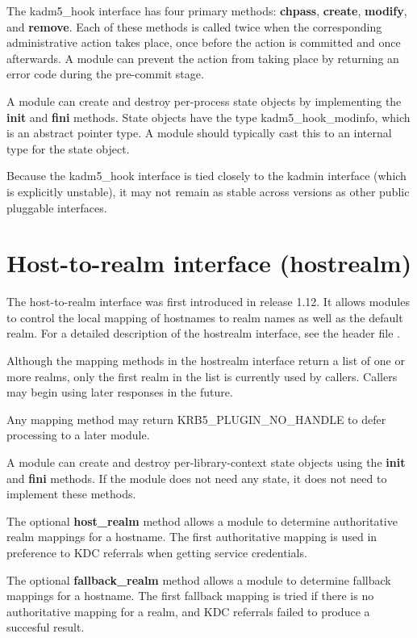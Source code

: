 \documentclass[letterpaper,10pt,english]{sphinxmanual}
\begin{document}
The kadm5\_hook interface has four primary methods: \textbf{chpass},
\textbf{create}, \textbf{modify}, and \textbf{remove}.  Each of these methods is
called twice when the corresponding administrative action takes place,
once before the action is committed and once afterwards.  A module can
prevent the action from taking place by returning an error code during
the pre-commit stage.

A module can create and destroy per-process state objects by
implementing the \textbf{init} and \textbf{fini} methods.  State objects have
the type kadm5\_hook\_modinfo, which is an abstract pointer type.  A
module should typically cast this to an internal type for the state
object.

Because the kadm5\_hook interface is tied closely to the kadmin
interface (which is explicitly unstable), it may not remain as stable
across versions as other public pluggable interfaces.


\section{Host-to-realm interface (hostrealm)}
\label{plugindev/hostrealm:hostrealm-plugin}\label{plugindev/hostrealm::doc}\label{plugindev/hostrealm:host-to-realm-interface-hostrealm}
The host-to-realm interface was first introduced in release 1.12.  It
allows modules to control the local mapping of hostnames to realm
names as well as the default realm.  For a detailed description of the
hostrealm interface, see the header file
.

Although the mapping methods in the hostrealm interface return a list
of one or more realms, only the first realm in the list is currently
used by callers.  Callers may begin using later responses in the
future.

Any mapping method may return KRB5\_PLUGIN\_NO\_HANDLE to defer
processing to a later module.

A module can create and destroy per-library-context state objects
using the \textbf{init} and \textbf{fini} methods.  If the module does not need
any state, it does not need to implement these methods.

The optional \textbf{host\_realm} method allows a module to determine
authoritative realm mappings for a hostname.  The first authoritative
mapping is used in preference to KDC referrals when getting service
credentials.

The optional \textbf{fallback\_realm} method allows a module to determine
fallback mappings for a hostname.  The first fallback mapping is tried
if there is no authoritative mapping for a realm, and KDC referrals
failed to produce a succesful result.
\end{document}
